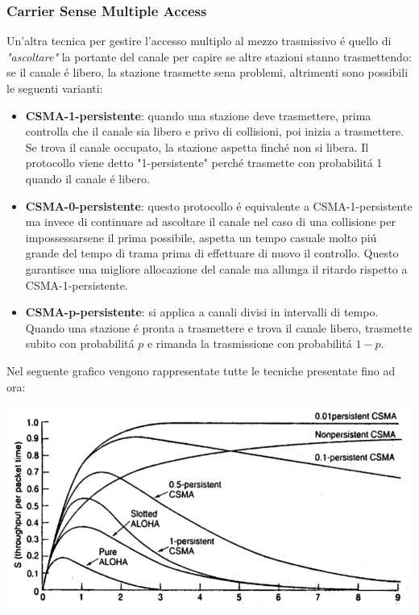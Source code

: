 \documentclass[12pt]{article}
\begin{document}
\subsubsection{Carrier Sense Multiple Access}\label{mac-allorazione-canale-a-contesa-csma}
Un'altra tecnica per gestire l'accesso multiplo al mezzo trasmissivo \'e quello di \textit{"ascoltare"} la portante del 
canale per capire se altre stazioni stanno trasmettendo: se il canale \'e libero, la stazione trasmette sena problemi, 
altrimenti sono possibili le seguenti varianti:
\begin{itemize}
    \item \textbf{CSMA-1-persistente}: quando una stazione deve trasmettere, prima controlla che il canale sia libero e 
          privo di collisioni, poi inizia a trasmettere. Se trova il canale occupato, la stazione aspetta finch\'e non si 
          libera. Il protocollo viene detto "1-persistente" perch\'e trasmette con probabilit\'a 1 quando il canale \'e     
          libero.
    \item \textbf{CSMA-0-persistente}: questo protocollo \'e equivalente a CSMA-1-persistente ma invece di continuare ad 
          ascoltare il canale nel caso di una collisione per impossessarsene il prima possibile, aspetta un tempo casuale 
          molto pi\'u grande del tempo di trama prima di effettuare di nuovo il controllo. Questo garantisce una migliore 
          allocazione del canale ma allunga il ritardo rispetto a CSMA-1-persistente.
    \item \textbf{CSMA-p-persistente}: si applica a canali divisi in intervalli di tempo. Quando una stazione \'e pronta 
          a trasmettere e trova il canale libero, trasmette subito con probabilit\'a $p$ e rimanda la trasmissione con 
          probabilit\'a $1-p$.
\end{itemize}
Nel seguente grafico vengono rappresentate tutte le tecniche presentate fino ad ora:
\begin{center}
	\includegraphics[scale=0.6]{livello_collegamento-img8.png}
\end{center}
\end{document}

